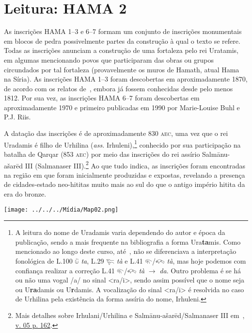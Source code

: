 \section{Leitura: HAMA 2}

As inscrições HAMA 1--3 e 6--7 formam um conjunto de inscrições monumentais
em blocos de pedra possivelmente partes da construção à qual o texto se refere.
Todas as inscrições anunciam a construção de uma fortaleza pelo rei Uratamis, em
algumas mencionando povos que participaram das obras ou grupos circundados por
tal fortaleza (provavelmente os muros de Hamath, atual Hama na Síria).
As inscrições HAMA 1--3 foram descobertas em aproximadamente 1870, de acordo com
os relatos de~\citet[pp. 333ff.]{UnexploredSyriaI}, embora já fossem conhecidas
desde pelo menos 1812.
Por sua vez, as inscrições HAMA 6--7 foram descobertas em aproximadamente 1970 e
primeiro publicadas em 1990 por Marie-Louise Buhl e P.J. Riis.

A datação das inscrições é de aproximadamente 830 \textsc{aec}, uma vez que
o rei
Uradamis é filho de Urhilina (\emph{ass.} Irhuleni),\footnote{
	A leitura do nome de Uradamis varia dependendo do autor e
	época da publicação, sendo a mais frequente na bibliografia a forma
	Ura\textbf{ta}mis.
	Como mencionado ao longo deste curso, até~\citet{Rieken2008}, não se
	diferenciava a interpretação fonológica de
	L.100 𔑰 \emph{ta}, L.29 𔐞 \emph{tà} e L.41 𔐬\slash{}𔐫 \emph{tà}, mas hoje
	podemos com confiança realizar a correção L.41 𔐬\slash{}𔐫 \emph{tà}
	$\rightarrow$ \emph{da}. Outro problema é se há ou não uma vogal /a/ no sinal
	<ra\slash{}i>, sendo assim possível que o nome seja ou U\textbf{ra}damis ou
	U\textbf{r}damis.
	A vocalização do sinal <ra\slash{}i> é resolvida no caso de Urhilina pela
	existência da forma assíria do nome, Irhuleni.
} conhecido por sua
participação na batalha de Qarqar (853 \textsc{aec}) por meio das inscrições
do rei assírio Salmānu-ašarēd III (Salmanaser III).\footnote{Mais detalhes
	sobre Irhulani\slash{}Urhilina e Salmānu-ašarēd\slash{}Salmanaser III
	em~,
	\href{https://publikationen.badw.de/en/rla/index\#5833}{v. 05 p. 162}.
}
Ao que tudo indica, as inscrições foram encontradas na região em que foram
inicialmente produzidas e expostas, revelando a presença de cidades-estado
neo-hititas muito mais ao sul do que o antigo império hitita da era do bronze.

\begin{flushright}
	\texttt{[image: ../../../Mídia/Map02.png]}
\end{flushright}

